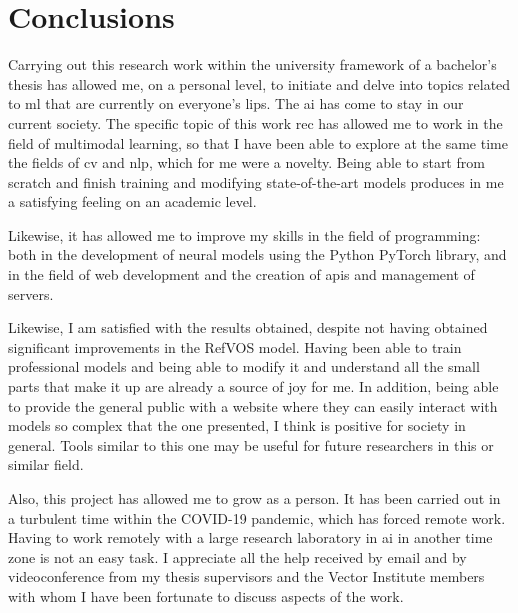 

\chapter{Conclusions}\label{cha:concl}



\drop Carrying out this research work within the university framework of a
bachelor's thesis has allowed me, on a personal level, to initiate and delve
into topics related to \gls{ml} that are currently on everyone's lips. The
\gls{ai} has come to stay in our current society. The specific topic of this
work \gls{rec} has allowed me to work in the field of multimodal learning, so
that I have been able to explore at the same time the fields of \gls{cv} and
\gls{nlp}, which for me were a novelty. Being able to start from scratch and
finish training and modifying state-of-the-art models produces in me a
satisfying feeling on an academic level.

Likewise, it has allowed me to improve my skills in the field of programming:
both in the development of neural models using the Python PyTorch library, and
in the field of web development and the creation of \glspl{api} and management
of servers.

Likewise, I am satisfied with the results obtained, despite not having obtained
significant improvements in the RefVOS model. Having been able to train
professional models and being able to modify it and understand all the small
parts that make it up are already a source of joy for me. In addition, being
able to provide the general public with a website where they can easily
interact with models so complex that the one presented, I think is positive for
society in general. Tools similar to this one may be useful for future
researchers in this or similar field.

Also, this project has allowed me to grow as a person. It has been carried out
in a turbulent time within the COVID-19 pandemic, which has forced remote
work. Having to work remotely with a large research laboratory in \gls{ai} in
another time zone is not an easy task. I appreciate all the help received by
email and by videoconference from my thesis supervisors and the Vector
Institute members with whom I have been fortunate to discuss aspects of the
work.



